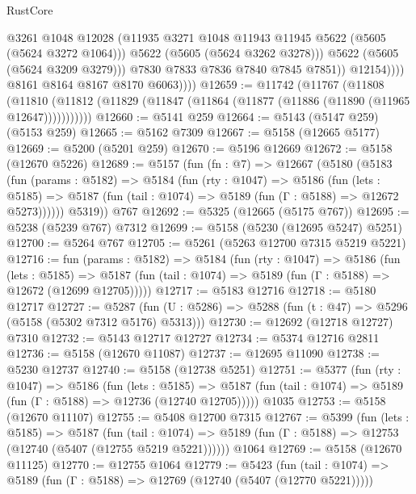\begin{lexlean}{RustCore}
\begin{coremodule}
                            @3261
                            @1048
                            @12028
                            (@11935 @3271 @1048 @11943 @11945 @5622 (@5605 (@5624 @3272 @1064)))
                            @5622
                            (@5605 (@5624 @3262 @3278)))
                          @5622
                          (@5605 (@5624 @3209 @3279)))
                        @7830
                        @7833
                        @7836
                        @7840
                        @7845
                        @7851))
                    @12154))))
            @8161
            @8164
            @8167
            @8170
            @6063))))
@12659 := @11742
    (@11767
      (@11808
        (@11810 (@11812 (@11829 (@11847 (@11864 (@11877 (@11886 (@11890 (@11965 @12647)))))))))))
@12660 := @5141 @259
@12664 := @5143 (@5147 @259) (@5153 @259)
@12665 := @5162 @7309
@12667 := @5158 (@12665 @5177)
@12669 := @5200 (@5201 @259)
@12670 := @5196 @12669
@12672 := @5158 (@12670 @5226)
@12689 := @5157
    (fun (fn : @7) =>
    @12667
      (@5180
        (@5183
          (fun (params : @5182) =>
          @5184
            (fun (rty : @1047) =>
            @5186
              (fun (lets : @5185) =>
              @5187 (fun (tail : @1074) => @5189 (fun (Γ : @5188) => @12672 @5273))))))
        @5319))
    @767
@12692 := @5325 (@12665 (@5175 @767))
@12695 := @5238 (@5239 @767) @7312
@12699 := @5158 (@5230 (@12695 @5247) @5251)
@12700 := @5264 @767
@12705 := @5261 (@5263 @12700 @7315 @5219 @5221)
@12716 := fun (params : @5182) =>
  @5184
    (fun (rty : @1047) =>
    @5186
      (fun (lets : @5185) =>
      @5187 (fun (tail : @1074) => @5189 (fun (Γ : @5188) => @12672 (@12699 @12705)))))
@12717 := @5183 @12716
@12718 := @5180 @12717
@12727 := @5287
    (fun (U : @5286) => @5288 (fun (t : @47) => @5296 (@5158 (@5302 @7312 @5176) @5313)))
@12730 := @12692 (@12718 @12727) @7310
@12732 := @5143 @12717 @12727
@12734 := @5374 @12716 @2811
@12736 := @5158 (@12670 @11087)
@12737 := @12695 @11090
@12738 := @5230 @12737
@12740 := @5158 (@12738 @5251)
@12751 := @5377
    (fun (rty : @1047) =>
    @5186
      (fun (lets : @5185) =>
      @5187 (fun (tail : @1074) => @5189 (fun (Γ : @5188) => @12736 (@12740 @12705)))))
    @1035
@12753 := @5158 (@12670 @11107)
@12755 := @5408 @12700 @7315
@12767 := @5399
    (fun (lets : @5185) =>
    @5187
      (fun (tail : @1074) =>
      @5189 (fun (Γ : @5188) => @12753 (@12740 (@5407 (@12755 @5219 @5221))))))
    @1064
@12769 := @5158 (@12670 @11125)
@12770 := @12755 @1064
@12779 := @5423
    (fun (tail : @1074) => @5189 (fun (Γ : @5188) => @12769 (@12740 (@5407 (@12770 @5221)))))

\end{coremodule}
\end{lexlean}
